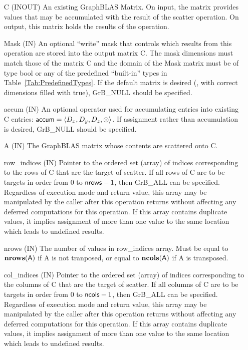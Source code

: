 \begin{itemize}[leftmargin=1in]
    \item[{\sf C}]    ({\sf INOUT}) An existing GraphBLAS Matrix.  On input,
    the matrix provides values that may be accumulated with the result of the
    scatter operation.  On output, this matrix holds the results of the
    operation.

    \item[{\sf Mask}] ({\sf IN}) An optional ``write'' mask that controls which
    results from this operation are stored into the output matrix {\sf C}. The 
    mask dimensions must match those of the matrix {\sf C} and the domain of the 
    {\sf Mask} matrix must be of type {\sf bool} or any of the predefined 
    ``built-in'' types in Table~\ref{Tab:PredefinedTypes}.  If the default
    matrix is desired (\ie, with correct dimensions filled with {\sf true}), 
    {\sf GrB\_NULL} should be specified.

    \item[{\sf accum}]    ({\sf IN}) An optional operator used for accumulating
    entries into existing {\sf C} entries: ${\sf accum} = \langle D_x,
    D_y, D_z,\odot \rangle$. If assignment rather than accumulation is
    desired, {\sf GrB\_NULL} should be specified.

    \item[{\sf A}]       ({\sf IN}) The GraphBLAS matrix whose contents are 
    scattered onto {\sf C}.
    
    \item[{\sf row\_indices}]  ({\sf IN}) Pointer to the ordered set (array) of 
    indices corresponding to the rows of {\sf C} that are the target of scatter.  If all rows
    of {\sf C} are to be targets in order from $0$ to ${\sf nrows} - 1$, then 
    {\sf GrB\_ALL} can be specified.  Regardless of execution mode and return 
    value, this array may be manipulated by the caller after this operation 
    returns without affecting any deferred computations for this operation.
    If this array contains duplicate values, it implies assignment of more 
    than one value to the same location which leads to undefined results.

    \item[{\sf nrows}] ({\sf IN}) The number of values in {\sf row\_indices} 
	array. Must be equal to $\bold{nrows}({\sf A})$ if {\sf A} is not tranposed,
	or equal to $\bold{ncols}({\sf A})$ if {\sf A} is transposed.

    \item[{\sf col\_indices}]  ({\sf IN}) Pointer to the ordered set (array) of 
    indices corresponding to the columns of {\sf C} that are the target of scatter.  If all 
    columns of {\sf C} are to be targets in order from $0$ to ${\sf ncols} - 1$, 
    then {\sf GrB\_ALL} can be specified.  Regardless of execution mode and return 
    value, this array may be manipulated by the caller after this operation 
    returns without affecting any deferred computations for this operation.
    If this array contains duplicate values, it implies assignment of more 
    than one value to the same location which leads to undefined results.
    

\end{itemize}
